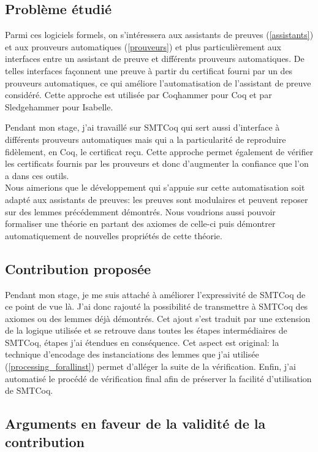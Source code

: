 \documentclass[11pt]{article}
\begin{document}
\subsection{Problème étudié}

Parmi ces logiciels formels, on s'intéressera aux assistants de preuves (\ref{assistants}) et aux prouveurs automatiques (\ref{prouveurs}) et plus particulièrement aux interfaces entre un assistant de preuve et différents prouveurs automatiques. De telles interfaces façonnent une preuve à partir du certificat fourni par un des prouveurs automatiques, ce qui améliore l'automatisation de l'assistant de preuve considéré. Cette approche est utilisée par Coqhammer \cite{coqhammer} pour Coq et par Sledgehammer \cite{sledgehammer_manual} pour Isabelle.

Pendant mon stage, j'ai travaillé sur SMTCoq qui sert aussi d'interface à différents prouveurs automatiques mais qui a la particularité de reproduire fidèlement, en Coq, le certificat reçu. Cette approche permet également de vérifier les certificats fournis par les prouveurs et donc d'augmenter la confiance que l'on a dans ces outils.\\

Nous aimerions que le développement qui s'appuie sur cette automatisation soit adapté aux assistants de preuves: les preuves sont modulaires et peuvent reposer sur des lemmes précédemment démontrés. Nous voudrions aussi pouvoir formaliser une théorie en partant des axiomes de celle-ci puis démontrer automatiquement de nouvelles propriétés de cette théorie.

\subsection{Contribution proposée}

Pendant mon stage, je me suis attaché à améliorer l'expressivité de SMTCoq de ce point de vue là. J'ai donc rajouté la possibilité de transmettre à SMTCoq des axiomes ou des lemmes déjà démontrés. Cet ajout s'est traduit par une extension de la logique utilisée et se retrouve dans toutes les étapes intermédiaires de SMTCoq, étapes j'ai étendues en conséquence.  Cet aspect est original: la technique d'encodage des instanciations des lemmes que j'ai utilisée (\ref{processing_forallinst}) permet d'alléger la suite de la vérification. Enfin, j'ai automatisé le procédé de vérification final afin de préserver la facilité d'utilisation de SMTCoq.


\subsection{Arguments en faveur de la validité de la contribution}
\end{document}
